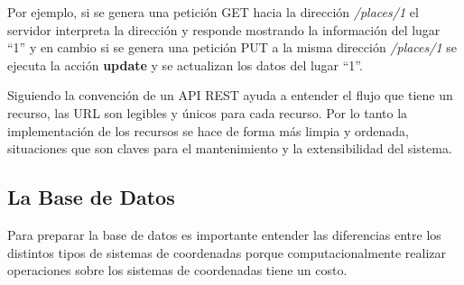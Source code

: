 


   Por ejemplo, si se genera una petición GET hacia la direcci\'on
   \mbox{\emph{/places/1}}  el servidor interpreta la dirección y responde
   mostrando la información del lugar “1” y en cambio si se genera
   una petición PUT a la misma direcci\'on \emph{/places/1} se ejecuta la acción \textbf{update} y se actualizan los datos del lugar ``1''.


   Siguiendo la convención de un API REST ayuda a entender el flujo que tiene un recurso,
   las URL son legibles y únicos para cada recurso. Por lo tanto la implementación   de los recursos se hace de forma más limpia y ordenada, situaciones que son   claves para el mantenimiento y la extensibilidad del sistema.




\subsection{La Base de Datos}
\label{sub:data_base}

         Para preparar la base de datos es importante entender las diferencias entre los distintos tipos de sistemas de coordenadas porque computacionalmente realizar operaciones sobre los sistemas de coordenadas tiene un costo.\\

